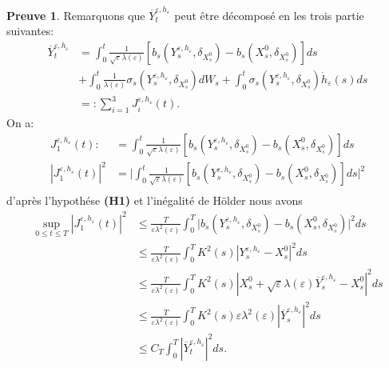 \documentclass[12pt,a4paper,twoside]{report}%
\theoremstyle{definition}
\newtheorem*{pr}{\textbf{Preuve}}
\numberwithin{equation}{section}
\begin{document}
\begin{pr}
	Remarquons que \(\overline{Y}_{t}^{\varepsilon,h_{\varepsilon}}\) peut être décomposé en les trois partie suivantes:
	\[
	\begin{aligned}
		\overline{Y}_{t}^{\varepsilon,h_{\varepsilon}} &= \int_{0}^{t} \frac{1}{\sqrt{\varepsilon}\lambda(\varepsilon)} [b_{s}(Y_{s}^{\varepsilon,h_{\varepsilon}}, \delta_{X_{s}^{0}}) - b_{s}(X_{s}^{0}, \delta_{X_{s}^{0}})] ds\\ &+ \int_{0}^{t} \frac{1}{\lambda(\varepsilon)} \sigma_{s}(Y_{s}^{\varepsilon,h_{\varepsilon}}, \delta_{X_{s}^{0}}) dW_{s} + \int_{0}^{t} \sigma_{s}(Y_{s}^{\varepsilon,h_{\varepsilon}}, \delta_{X_{s}^{0}}) \dot{h}_{\varepsilon}(s) ds\\&=: \sum_{i=1}^{3} J_{i}^{\varepsilon,h_{\varepsilon}}(t).
	\end{aligned}
	\]
	On a:
	\[
	\begin{aligned}
	J_1^{\varepsilon,h_\varepsilon}(t) : &=\int_{0}^{t} \frac{1}{\sqrt{\varepsilon}\lambda(\varepsilon)} [b_{s}(Y_{s}^{\varepsilon,h_{\varepsilon}}, \delta_{X_{s}^{0}}) - b_{s}(X_{s}^{0}, \delta_{X_{s}^{0}})] ds\\
	|J_1^{\varepsilon,h_\varepsilon}(t)|^2&=\Big|\int_{0}^{t} \frac{1}{\sqrt{\varepsilon}\lambda(\varepsilon)} [b_{s}(Y_{s}^{\varepsilon,h_{\varepsilon}}, \delta_{X_{s}^{0}}) - b_{s}(X_{s}^{0}, \delta_{X_{s}^{0}})] ds\Big|^2\\
	\end{aligned}
	\]
 d'après l'hypothése \textbf{(H1)} et l'inégalité de Hölder nous avons
 \[
 \begin{aligned}
 	\sup_{0 \leq t \leq T}|J_1^{\varepsilon,h_\varepsilon}(t)|^2
 	&\leq\frac{T}{\varepsilon\lambda^2(\varepsilon)}\int_{0}^{T}\Big|b_{s}(Y_{s}^{\varepsilon,h_{\varepsilon}}, \delta_{X_{s}^{0}}) - b_{s}(X_{s}^{0}, \delta_{X_{s}^{0}})\Big|^2ds\\
 	&\leq \frac{T}{\varepsilon\lambda^2(\varepsilon)}\int_{0}^{T}K^2(s)|Y_s^{\varepsilon,h_\varepsilon}-X_s^0|^2ds\\
 	&\leq \frac{T}{\varepsilon\lambda^2(\varepsilon)}\int_{0}^{T}K^2(s)|X_s^0 + \sqrt{\varepsilon}\lambda(\varepsilon)\overline{Y}_{s}^{\varepsilon,h_{\varepsilon}} - X_s^0|^2ds\\
 	&\leq \frac{T}{\varepsilon\lambda^2(\varepsilon)}\int_{0}^{T}K^2(s) \varepsilon\lambda^2(\varepsilon) |\overline{Y}_{s}^{\varepsilon,h_{\varepsilon}}|^2ds\\
 	&\leq C_T\int_{0}^{T}|\overline{Y}_{t}^{\varepsilon,h_{\varepsilon}}|^2ds.
 \end{aligned}
\]
\end{pr}
\end{document}
